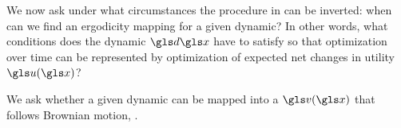 \begin{itemize}
%
%
%
%




We now ask under what circumstances the procedure in
 can be inverted: when can we find an ergodicity mapping for a
given dynamic? In other words, what conditions does the dynamic $\gd\x$
have to satisfy so that optimization over time can be represented by
optimization of expected net changes in utility $\gu(\x)$?

We ask whether a given dynamic can be mapped into a $\gv(\x)$ 
that follows Brownian motion, .


\end{itemize}
